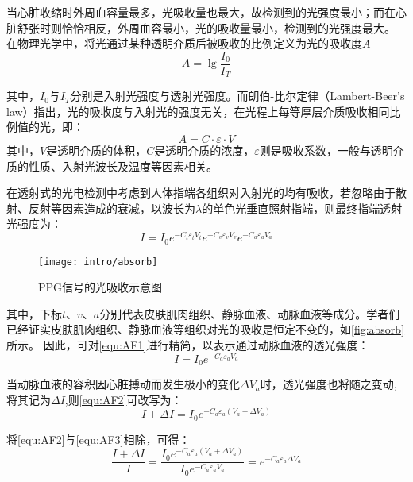 当心脏收缩时外周血容量最多，光吸收量也最大，故检测到的光强度最小；而在心脏舒张时则恰恰相反，外周血容最小，光的吸收量最小，检测到的光强度最大\cite{lhc,cwl}。
在物理光学中，将光通过某种透明介质后被吸收的比例定义为光的吸收度$A$
\begin{equation}
    \label{equ:LBL}
    A=\lg\frac{I_{0}}{I_{T}}
\end{equation}

其中，$I_{0}$与$I_{T}$分别是入射光强度与透射光强度。而朗伯-比尔定律（Lambert-Beer's law）指出，光的吸收度与入射光的强度无关，在光程上每等厚层介质吸收相同比例值的光，即：
\begin{equation}
    \label{equ:LBL2}
    A=C \cdot \varepsilon \cdot V
\end{equation}
其中，$V$是透明介质的体积，$C$是透明介质的浓度，$\varepsilon$则是吸收系数，一般与透明介质的性质、入射光波长及温度等因素相关。

在透射式的光电检测中考虑到人体指端各组织对入射光的均有吸收，若忽略由于散射、反射等因素造成的衰减，以波长为$\lambda$的单色光垂直照射指端，则最终指端透射光强度为\cite{4122392}：
\begin{equation}
    \label{equ:AF1}
    I=I_{0}e^{-C_{t}\varepsilon _{t}V_{t}}e^{-C_{v}\varepsilon _{v}V_{v}} e^{-C_{a}\varepsilon _{a}V_{a}} 
\end{equation}

\begin{figure}[htbp]
    \centering
    \texttt{[image: intro/absorb]}
    \caption{\label{fig:absorb}PPG信号的光吸收示意图}
\end{figure}

其中，下标$t$、$v$、$a$分别代表皮肤肌肉组织、静脉血液、动脉血液等成分。学者们已经证实皮肤肌肉组织、静脉血液等组织对光的吸收是恒定不变的\cite{1980Spectrophotometric,4122392}，如\autoref{fig:absorb}所示。
因此，可对\autoref{equ:AF1}进行精简，以表示通过动脉血液的透光强度\cite{PPGYY}：
\begin{equation}
    \label{equ:AF2}
    I=I_{0}e^{-C_{a}\varepsilon _{a}V_{a}} 
\end{equation}

当动脉血液的容积因心脏搏动而发生极小的变化$\Delta V_{a}$时，透光强度也将随之变动,将其记为$\Delta I$,则\autoref{equ:AF2}可改写为：
\begin{equation}
    \label{equ:AF3}
    I+\Delta I=I_{0}e^{-C_{a}\varepsilon _{a}(V_{a}+\Delta V_{a})} 
\end{equation}

将\autoref{equ:AF2}与\autoref{equ:AF3}相除，可得：
\begin{equation}
    \label{equ:AF4}
    \frac{I+\Delta I}{I}=\frac{I_{0}e^{-C_{a}\varepsilon _{a}(V_{a}+\Delta V_{a})}}{I_{0}e^{-C_{a}\varepsilon _{a}V_{a}}}=e^{-C_{a}\varepsilon _{a}\Delta V_{a}} 
\end{equation}

